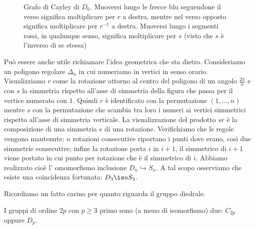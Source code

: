 \begin{rich}
%
\begin{figure}
\centering
{}
\caption{Grafo di Cayley di $D_6$. Muoversi lungo le frecce blu seguendone il verso significa moltiplicare per $r$ a destra, mentre nel verso opposto significa moltiplicare per $r^{-1}$ a destra. Muoversi lungo i segmenti rossi, in qualunque senso, significa moltiplicare per $s$ (visto che $s$ è l'inverso di se stessa)}
\end{figure}
%
Può essere anche utile richiamare l'idea geometrica che sta dietro. Consideriamo un poligono regolare $\Delta_n$ in cui numeriamo in vertici in senso orario.
%
%
Visualizziamo $r$ come la rotazione attorno al centro del poligono di un angolo $\frac{2\pi}{n}$ e con $s$ la simmetria rispetto all'asse di simmetria della figura che passa per il vertice numerato con $1$. Quindi $r$ è identificato con la permutazione $(1, \dots{}, n)$ mentre $s$ con la permutazione che scambia tra loro i numeri ai vertici simmetrici rispetto all'asse di simmetria verticale. La visualizzazione del prodotto $sr$ è la composizione di una simmetria e di una rotazione. Verifichiamo che le regole vengono mantenute: $n$ rotazioni consecutive riportano i punti dove erano, così due simmetrie consecutive; infine la rotazione porta $i$ in $i+1$, il simmetrico di $i+1$ viene portato in cui punto per rotazione che è il simmetrico di $i$. Abbiamo realizzato cioè l' omomorfismo inclusione $D_n \hookrightarrow S_n$. A tal scopo osserviamo che esiste una coincidenza fortunata: $D_3 \iso S_3$.
\end{rich}

Ricordiamo un fatto carino per quanto riguarda il gruppo diedrale.

\begin{prop}\label{prop:Gruppi2P}
I gruppi di ordine $2p$ con $p \ge 3$ primo sono (a meno di isomorfismo) due: $C_{2p}$ oppure $D_p$.
\end{prop}

